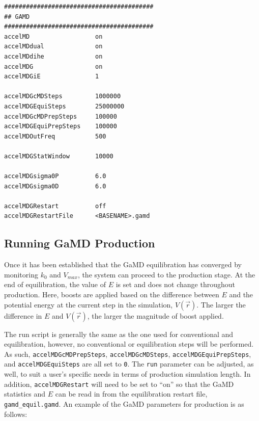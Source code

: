 \documentclass[9pt,tutorial,pubversion]{livecoms}
\begin{document}
\begin{lstlisting}[label=gamd_prod,caption=gamd\_equil.in, basicstyle=\small,backgroundcolor=\color{light-gray}]
#########################################
## GAMD                    
#########################################
accelMD                  on             
accelMDdual              on
accelMDdihe              on
accelMDG                 on        
accelMDGiE               1             
         
accelMDGcMDSteps         1000000        
accelMDGEquiSteps        25000000     
accelMDGcMDPrepSteps     100000         
accelMDGEquiPrepSteps    100000         
accelMDOutFreq           500

accelMDGStatWindow       10000

accelMDGsigma0P          6.0            
accelMDGsigma0D          6.0 

accelMDGRestart          off 
accelMDGRestartFile      <BASENAME>.gamd  

\end{lstlisting}

\subsection{Running GaMD Production}
\label{ss:gamd_production}
Once it has been established that the GaMD equilibration has converged by monitoring $k_{0}$ and $V_{max}$, the system can proceed to the production stage. At the end of equilibration, the value of $E$ is set and does not change throughout production. Here, boosts are applied based on the difference between $E$ and the potential energy at the current step in the simulation, $V\left(\vec{r}\right)$. The larger the difference in $E$ and $V\left(\vec{r}\right)$, the larger the magnitude of boost applied. 

The run script is generally the same as the one used for conventional and equilibration, however, no conventional or equilibration steps will be performed. As such, \texttt{accelMDGcMDPrepSteps}, \texttt{accelMDGcMDSteps}, \texttt{accelMDGEquiPrepSteps}, and \texttt{accelMDGEquiSteps} are all set to \texttt{0}. The \texttt{run} parameter can be adjusted, as well, to suit a user's specific needs in terms of production simulation length. In addition, \texttt{accelMDGRestart} will need to be set to ``on'' so that the GaMD statistics and $E$ can be read in from the equilibration restart file, \texttt{gamd\_equil.gamd}. An example of the GaMD parameters for production is as follows:
\end{document}
